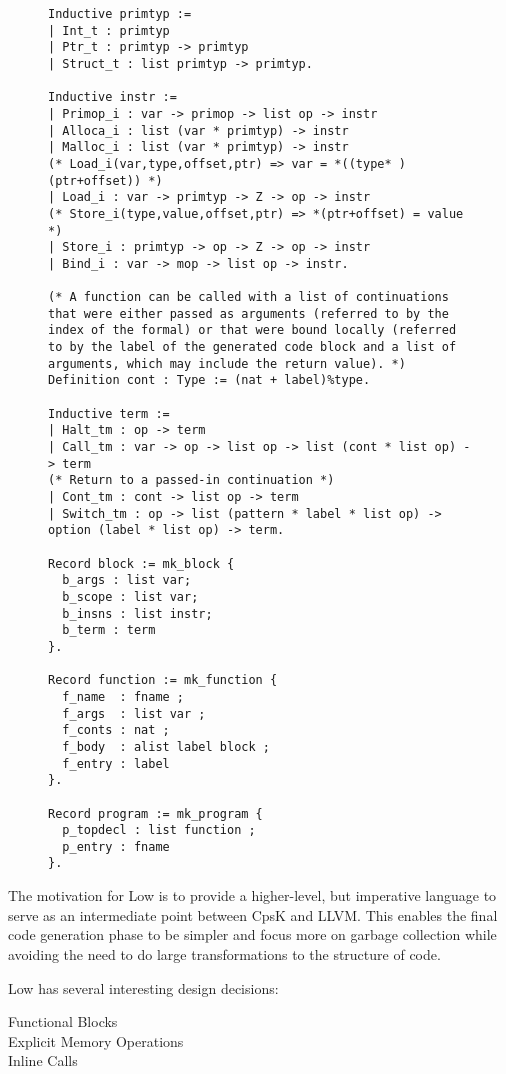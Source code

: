 \documentclass{article}
\begin{document}
\begin{figure}
\begin{lstlisting}
Inductive primtyp :=
| Int_t : primtyp
| Ptr_t : primtyp -> primtyp
| Struct_t : list primtyp -> primtyp.

Inductive instr :=
| Primop_i : var -> primop -> list op -> instr
| Alloca_i : list (var * primtyp) -> instr
| Malloc_i : list (var * primtyp) -> instr
(* Load_i(var,type,offset,ptr) => var = *((type* )(ptr+offset)) *)
| Load_i : var -> primtyp -> Z -> op -> instr
(* Store_i(type,value,offset,ptr) => *(ptr+offset) = value *)
| Store_i : primtyp -> op -> Z -> op -> instr
| Bind_i : var -> mop -> list op -> instr.

(* A function can be called with a list of continuations that were either passed as arguments (referred to by the index of the formal) or that were bound locally (referred to by the label of the generated code block and a list of arguments, which may include the return value). *)
Definition cont : Type := (nat + label)%type.

Inductive term :=
| Halt_tm : op -> term
| Call_tm : var -> op -> list op -> list (cont * list op) -> term
(* Return to a passed-in continuation *)
| Cont_tm : cont -> list op -> term
| Switch_tm : op -> list (pattern * label * list op) -> option (label * list op) -> term.

Record block := mk_block {
  b_args : list var;
  b_scope : list var;
  b_insns : list instr;
  b_term : term
}.

Record function := mk_function {
  f_name  : fname ;
  f_args  : list var ;
  f_conts : nat ;
  f_body  : alist label block ; 
  f_entry : label
}.

Record program := mk_program {
  p_topdecl : list function ;
  p_entry : fname
}.
\end{lstlisting}
\end{figure}

The motivation for Low is to provide a higher-level, but imperative language to serve as an intermediate point between CpsK and LLVM. This enables the final code generation phase to be simpler and focus more on garbage collection while avoiding the need to do large transformations to the structure of code.

Low has several interesting design decisions:
\begin{description}
\item[Functional Blocks]
\item[Explicit Memory Operations]
\item[Inline Calls]
\end{description}
\end{document}
